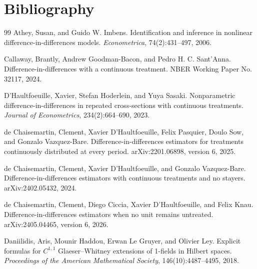 \documentclass[11pt]{article}
\theoremstyle{definition}
\theoremstyle{plain}
\theoremstyle{remark}
\begin{document}
\section*{Bibliography}
\begin{thebibliography}{99}
Athey, Susan, and Guido W. Imbens.
\newblock Identification and inference in nonlinear difference-in-differences models.
\newblock \emph{Econometrica}, 74(2):431--497, 2006.

Callaway, Brantly, Andrew Goodman-Bacon, and Pedro H. C. Sant'Anna.
\newblock Difference-in-differences with a continuous treatment.
\newblock NBER Working Paper No. 32117, 2024.

D'Haultfoeuille, Xavier, Stefan Hoderlein, and Yuya Sasaki.
\newblock Nonparametric difference-in-differences in repeated cross-sections with continuous treatments.
\newblock \emph{Journal of Econometrics}, 234(2):664--690, 2023.

de Chaisemartin, Clement, Xavier D'Haultfoeuille, Felix Pasquier, Doulo Sow, and Gonzalo Vazquez-Bare.
\newblock Difference-in-differences estimators for treatments continuously distributed at every period.
\newblock arXiv:2201.06898, version 6, 2025.

de Chaisemartin, Clement, Xavier D'Haultfoeuille, and Gonzalo Vazquez-Bare.
\newblock Difference-in-differences estimators with continuous treatments and no stayers.
\newblock arXiv:2402.05432, 2024.

de Chaisemartin, Clement, Diego Ciccia, Xavier D'Haultfoeuille, and Felix Knau.
\newblock Difference-in-differences estimators when no unit remains untreated.
\newblock arXiv:2405.04465, version 6, 2026.

Daniilidis, Aris, Mounir Haddou, Erwan Le Gruyer, and Olivier Ley.
\newblock Explicit formulas for \(C^{1,1}\) Glaeser--Whitney extensions of 1-fields in Hilbert spaces.
\newblock \emph{Proceedings of the American Mathematical Society}, 146(10):4487--4495, 2018.


\end{thebibliography}
\end{document}
